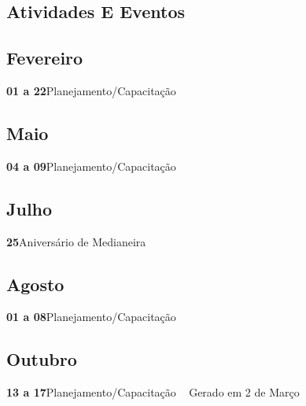 \documentclass[thesis]{hmcposter}
\begin{document}
\begin{poster}
\normalsize \section{\color{hmcorange}Atividades E Eventos}\subsection{Fevereiro}\textbf{01 a 22}\quad \quad Planejamento/Capacitação \newline\subsection{Maio}\textbf{04 a 09}\quad \quad Planejamento/Capacitação \newline\subsection{Julho}\textbf{25}\quad \quad \quad \quad Aniversário de Medianeira \newline\subsection{Agosto}\textbf{01 a 08}\quad \quad Planejamento/Capacitação \newline\subsection{Outubro}\textbf{13 a 17}\quad \quad Planejamento/Capacitação \newline ~ \vfill \hfill \small \color{hmcorange}Gerado em 2 de Março \end{poster}
\end{document}
